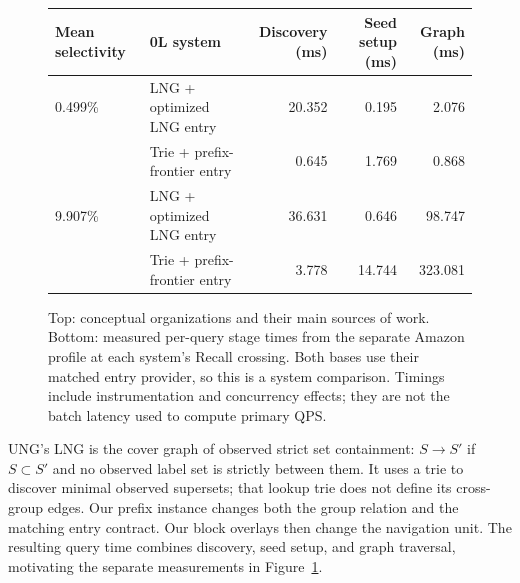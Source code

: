 \begin{figure}[t]
\centering
{}
\par\smallskip
\begin{tabular}{llrrr}
\toprule
Mean selectivity & 0L system & Discovery (ms) & Seed setup (ms) & Graph (ms)\\
\midrule
0.499\% & LNG + optimized LNG entry & 20.352 & 0.195 & 2.076\\
            & Trie + prefix-frontier entry & 0.645 & 1.769 & 0.868\\
9.907\% & LNG + optimized LNG entry & 36.631 & 0.646 & 98.747\\
            & Trie + prefix-frontier entry & 3.778 & 14.744 & 323.081\\
\bottomrule
\end{tabular}
\caption{Top: conceptual organizations and their main sources of work. Bottom: measured per-query stage times from the
separate Amazon profile at each system's Recall crossing. Both bases use
their matched entry provider, so this is a system comparison. Timings include
instrumentation and concurrency effects; they are not the batch latency used
to compute primary QPS. }
\label{fig:motivation}
\end{figure}

UNG's LNG is the cover graph of observed strict set containment:
$S\to S'$ if $S\subset S'$ and no observed label set is strictly between
them.  It uses a trie to discover minimal observed supersets; that lookup
trie does not define its cross-group edges.  Our prefix instance changes both
the group relation and the matching entry contract.  Our block overlays then
change the navigation unit.  The resulting query time combines discovery, seed setup, and graph
traversal, motivating the separate measurements in Figure~\ref{fig:motivation}.
